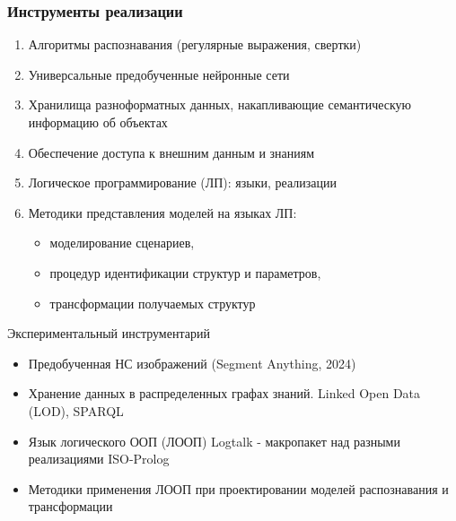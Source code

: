 \documentclass[handout]{beamer}
\begin{document}
\begin{frame}
  \frametitle{Инструменты реализации}
  \begin{enumerate}
  \item Алгоритмы распознавания (регулярные выражения, свертки)
  \item Универсальные предобученные нейронные сети
  \item Хранилища разноформатных данных, накапливающие семантическую информацию об объектах
  \item Обеспечение доступа к внешним данным и знаниям
  \item Логическое программирование (ЛП): языки, реализации
  \item Методики представления моделей на языках ЛП:
    \begin{itemize}
    \item моделирование сценариев,
    \item процедур идентификации структур и параметров,
    \item трансформации получаемых структур
    \end{itemize}
  \end{enumerate}
  Экспериментальный инструментарий
  \begin{itemize}
  \item Предобученная НС изображений (Segment Anything, 2024)
  \item Хранение данных в распределенных графах знаний. Linked Open Data (LOD), SPARQL
  \item Язык логического ООП (ЛООП) Logtalk - макропакет над разными реализациями ISO-Prolog
    \item Методики применения ЛООП при проектировании моделей распознавания и трансформации
  \end{itemize}
\end{frame}
\end{document}
